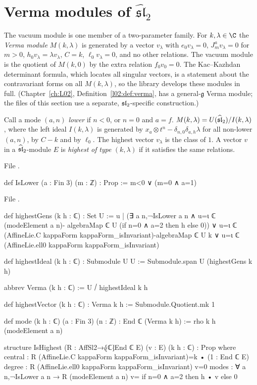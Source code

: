\section{Verma modules of \texorpdfstring{$\widehat{\mathfrak{sl}}_2$}{affine sl2}}\label{l08:sec:verma}

The vacuum module is one member of a two-parameter family. For $k,\lambda\in\C$ the \emph{Verma module}
$M(k,\lambda)$ is generated by a vector $v_\lambda$ with $e_0v_\lambda = 0$, $J^a_mv_\lambda=0$ for $m>0$,
$h_0v_\lambda = \lambda v_\lambda$, $C=k$, $\ell_0v_\lambda = 0$, and no other relations. The vacuum module is the
quotient of $M(k,0)$ by the extra relation $f_0v_0 = 0$. The Kac--Kazhdan determinant formula, which
locates all singular vectors, is a statement about the contravariant forms on all $M(k,\lambda)$, so the
library develops these modules in full. (Chapter~\ref{ch:L02}, Definition~\ref{l02:def:verma}, has a
general-$\mathfrak g$ Verma module; the files of this section use a separate, $\mathfrak{sl}_2$-specific
construction.)

\begin{definition}\label{l08:def:verma}
Call a mode $(a,n)$ \emph{lower} if $n<0$, or $n=0$ and $a=f$. $M(k,\lambda) = U(\widehat{\mathfrak{sl}}_2)/I(k,\lambda)$,
where the left ideal $I(k,\lambda)$ is generated by $x_a\otimes t^n - \delta_{n,0}\delta_{a,h}\lambda$ for all
non-lower $(a,n)$, by $C-k$ and by $\ell_0$. The highest vector $v_\lambda$ is the class of $1$. A vector $v$ in a
$\widehat{\mathfrak{sl}}_2$-module $E$ is \emph{highest of type $(k,\lambda)$} if it satisfies the same relations.
\end{definition}

\noindent File .
\begin{leancode}
def IsLower (a : Fin 3) (m : ℤ) : Prop := m<0 ∨ (m=0 ∧ a=1)
\end{leancode}
\noindent File .
\begin{leancode}
def highestGens (k h : ℂ) : Set U := {u |
    (∃ a n,¬IsLower a n ∧ u=ι ℂ (modeElement a n)-
      algebraMap ℂ U (if n=0 ∧ a=2 then h else 0)) ∨
    u=ι ℂ (AffineLie.C kappaForm kappaForm_isInvariant)-algebraMap ℂ U k ∨
    u=ι ℂ (AffineLie.ell0 kappaForm kappaForm_isInvariant)}

def highestIdeal (k h : ℂ) : Submodule U U := Submodule.span U (highestGens k h)

abbrev Verma (k h : ℂ) := U ⧸ highestIdeal k h

def highestVector (k h : ℂ) : Verma k h := Submodule.Quotient.mk 1

def mode (k h : ℂ) (a : Fin 3) (n : ℤ) : End ℂ (Verma k h) := rho k h (modeElement a n)

structure IsHighest (R : AffSl2→ₗ⁅ℂ⁆End ℂ E) (v : E) (k h : ℂ) : Prop where
  central : R (AffineLie.C kappaForm kappaForm_isInvariant)=k • (1 : End ℂ E)
  degree : R (AffineLie.ell0 kappaForm kappaForm_isInvariant) v=0
  modes : ∀ a n,¬IsLower a n → R (modeElement a n) v=
    if n=0 ∧ a=2 then h • v else 0
\end{leancode}

